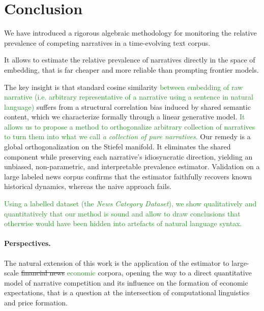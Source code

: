 \documentclass[
  journal=medium,
  manuscript=article-type,
  year=2025,
  volume=1,
]{cup-journal}
\begin{document}
\bigskip




\section{Conclusion}
\label{sec:conclusion}

We have introduced a rigorous algebraic methodology for monitoring the relative
prevalence of competing narratives in a time-evolving text corpus.

{\color{ForestGreen}
It allows to estimate the relative prevalence of narratives directly in the space of embedding, that is far cheaper and more reliable than prompting frontier models.
}

The key insight is that standard cosine similarity \textcolor{ForestGreen}{between embedding of raw narrative (i.e. arbitrary representative of a narrative using a sentence in natural language)} suffers from a structural correlation bias induced
by shared semantic content, which we characterize formally through a linear
generative model.
\textcolor{ForestGreen}{It allows us to propose a method to orthogonalize arbitrary collection of narratives to turn them into what we call \emph{a collection of pure narratives}.}
Our remedy is a global orthogonalization on the Stiefel manifold. 
It eliminates
the shared component while preserving each narrative's idiosyncratic direction,
yielding an unbiased, non-parametric, and interpretable prevalence estimator.
Validation on a large labeled news corpus confirms that the estimator
faithfully recovers known historical dynamics, whereas the naive approach fails.

\textcolor{ForestGreen}{
Using a labelled dataset (the \emph{News Category Dataset}), we show qualitatively and quantitatively that our method is sound and allow to draw conclusions that otherwise would have been hidden into artefacts of natural language syntax. 
}

\paragraph{Perspectives.}
The natural extension of this work is the application of the estimator to
large-scale \st{financial news} \textcolor{ForestGreen}{economic} corpora, opening the way to a direct quantitative
model of narrative competition and its influence on the formation of
economic expectations, that is a question at the intersection of computational linguistics
and price formation.
\end{document}
